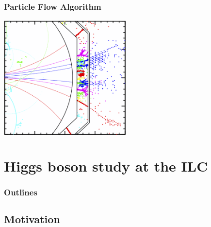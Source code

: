 \documentclass{beamer}
\begin{document}
\begin{frame}
  \frametitle{Particle Flow Algorithm}

  \begin{center}
    \includegraphics[width = 0.5\textwidth]{Pictures/ild_particleFlowConcept.png}
  \end{center}
\end{frame}
  
\section{Higgs boson study at the ILC}
  \begin{frame}
    \frametitle{Outlines}
    \begin{minipage}{\textwidth}
      \tableofcontents[currentsection,hideothersubsections, 
      sectionstyle=show/shaded,]
    \end{minipage}
  \end{frame}

  \subsection{Motivation}
\end{document}
